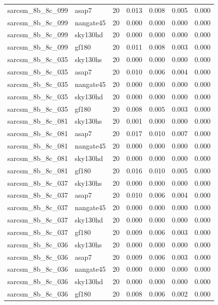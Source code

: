 \begin{tabular}{llrrrrr}
sarcsm\_8b\_8c\_099 & asap7 & 20 & 0.013 & 0.008 & 0.005 & 0.000 \\
sarcsm\_8b\_8c\_099 & nangate45 & 20 & 0.000 & 0.000 & 0.000 & 0.000 \\
sarcsm\_8b\_8c\_099 & sky130hd & 20 & 0.000 & 0.000 & 0.000 & 0.000 \\
sarcsm\_8b\_8c\_099 & gf180 & 20 & 0.011 & 0.008 & 0.003 & 0.000 \\
sarcsm\_8b\_8c\_035 & sky130hs & 20 & 0.000 & 0.000 & 0.000 & 0.000 \\
sarcsm\_8b\_8c\_035 & asap7 & 20 & 0.010 & 0.006 & 0.004 & 0.000 \\
sarcsm\_8b\_8c\_035 & nangate45 & 20 & 0.000 & 0.000 & 0.000 & 0.000 \\
sarcsm\_8b\_8c\_035 & sky130hd & 20 & 0.000 & 0.000 & 0.000 & 0.000 \\
sarcsm\_8b\_8c\_035 & gf180 & 20 & 0.008 & 0.005 & 0.003 & 0.000 \\
sarcsm\_8b\_8c\_081 & sky130hs & 20 & 0.001 & 0.000 & 0.000 & 0.000 \\
sarcsm\_8b\_8c\_081 & asap7 & 20 & 0.017 & 0.010 & 0.007 & 0.000 \\
sarcsm\_8b\_8c\_081 & nangate45 & 20 & 0.000 & 0.000 & 0.000 & 0.000 \\
sarcsm\_8b\_8c\_081 & sky130hd & 20 & 0.000 & 0.000 & 0.000 & 0.000 \\
sarcsm\_8b\_8c\_081 & gf180 & 20 & 0.016 & 0.010 & 0.005 & 0.000 \\
sarcsm\_8b\_8c\_037 & sky130hs & 20 & 0.000 & 0.000 & 0.000 & 0.000 \\
sarcsm\_8b\_8c\_037 & asap7 & 20 & 0.010 & 0.006 & 0.004 & 0.000 \\
sarcsm\_8b\_8c\_037 & nangate45 & 20 & 0.000 & 0.000 & 0.000 & 0.000 \\
sarcsm\_8b\_8c\_037 & sky130hd & 20 & 0.000 & 0.000 & 0.000 & 0.000 \\
sarcsm\_8b\_8c\_037 & gf180 & 20 & 0.009 & 0.006 & 0.003 & 0.000 \\
sarcsm\_8b\_8c\_036 & sky130hs & 20 & 0.000 & 0.000 & 0.000 & 0.000 \\
sarcsm\_8b\_8c\_036 & asap7 & 20 & 0.009 & 0.006 & 0.003 & 0.000 \\
sarcsm\_8b\_8c\_036 & nangate45 & 20 & 0.000 & 0.000 & 0.000 & 0.000 \\
sarcsm\_8b\_8c\_036 & sky130hd & 20 & 0.000 & 0.000 & 0.000 & 0.000 \\
sarcsm\_8b\_8c\_036 & gf180 & 20 & 0.008 & 0.006 & 0.002 & 0.000 \\

\end{tabular}
